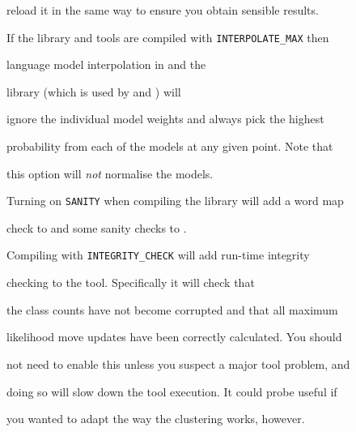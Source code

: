 reload it in the same way to ensure you obtain sensible results.













If the library and tools are compiled with {\tt INTERPOLATE\_MAX} then


language model interpolation in  and the 


library (which is used by  and ) will


ignore the individual model weights and always pick the highest


probability from each of the models at any given point.  Note that


this option will \textit{not} normalise the models.













Turning on {\tt SANITY} when compiling the library will add a word map


check to  and some sanity checks to .













Compiling with {\tt INTEGRITY\_CHECK} will add run-time integrity


checking to the  tool.  Specifically it will check that


the class counts have not become corrupted and that all maximum


likelihood move updates have been correctly calculated.  You should


not need to enable this unless you suspect a major tool problem, and


doing so will slow down the tool execution.  It could probe useful if


you wanted to adapt the way the clustering works, however.


